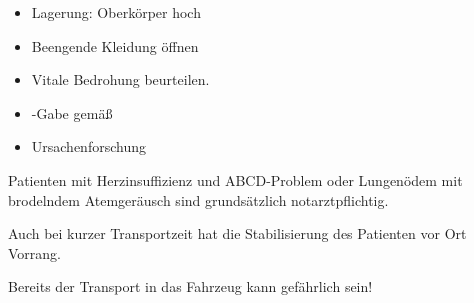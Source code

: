 
\label{m:herzinsuffizienz}
\begin{itemize}
  \item Lagerung: Oberkörper hoch
  \item Beengende Kleidung öffnen
  \item Vitale Bedrohung beurteilen. \TxBeiVit \TxMassVitMK
  \item {}-Gabe gemäß 
  \item Ursachenforschung
\end{itemize}

\begin{Danger}
  \item Patienten mit Herzinsuffizienz und ABCD-Problem oder Lungenödem mit 
  brodelndem Atemgeräusch sind grundsätzlich notarztpflichtig. 
  
  Auch bei kurzer Transportzeit hat die Stabilisierung des Patienten vor Ort Vorrang.
  
  Bereits der Transport in das Fahrzeug kann gefährlich sein!
\end{Danger}